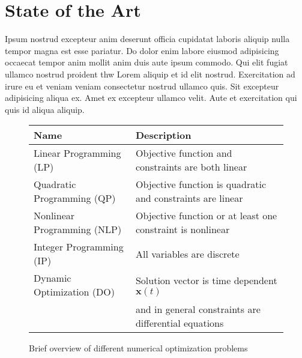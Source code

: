 \chapter{State of the Art}
\label{ch:sota}


Ipsum nostrud excepteur anim deserunt officia cupidatat laboris aliquip nulla tempor magna est esse pariatur. 
Do dolor enim labore eiusmod adipisicing occaecat tempor anim mollit anim duis aute ipsum commodo. 
Qui elit fugiat ullamco nostrud proident \gls{thw} Lorem aliquip et id elit nostrud.
Exercitation ad irure eu et veniam veniam consectetur nostrud ullamco quis. 
Sit excepteur adipisicing aliqua ex. Amet ex excepteur ullamco velit. 
Aute et exercitation qui quis id aliqua aliquip.
\begin{figure}
    \centering
    \begin{tabular}{ll}
        \toprule 
        \textbf{Name} & \textbf{Description}\\
        \midrule 
        Linear Programming (LP) & Objective function and constraints are both linear\\
        Quadratic Programming (QP) & Objective function is quadratic and constraints are linear\\
        Nonlinear Programming (NLP) & Objective function or at least one constraint is nonlinear\\
        Integer Programming (IP) & All variables are discrete\\
        Dynamic Optimization (DO) & Solution vector is time dependent $\bm{x}(t)$ \\&and in general constraints are differential equations\\
        \bottomrule
    \end{tabular}
    \caption{Brief overview of different numerical optimization problems}
    \label{tab:optClass}
\end{figure}

